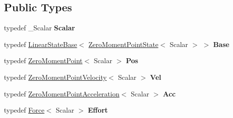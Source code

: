 \subsection*{Public Types}
\begin{DoxyCompactItemize}
\item 
typedef \+\_\+\+Scalar {\bfseries Scalar}\hypertarget{classow__core_1_1ZeroMomentPointState_ac55c44c9f7bf01c0d27d3e35f498a9af}{}\label{classow__core_1_1ZeroMomentPointState_ac55c44c9f7bf01c0d27d3e35f498a9af}

\item 
typedef \hyperlink{classow__core_1_1LinearStateBase}{Linear\+State\+Base}$<$ \hyperlink{classow__core_1_1ZeroMomentPointState}{Zero\+Moment\+Point\+State}$<$ Scalar $>$ $>$ {\bfseries Base}\hypertarget{classow__core_1_1ZeroMomentPointState_a3c319b5b41e564eec43dfaa84d9db30e}{}\label{classow__core_1_1ZeroMomentPointState_a3c319b5b41e564eec43dfaa84d9db30e}

\item 
typedef \hyperlink{classow__core_1_1ZeroMomentPoint}{Zero\+Moment\+Point}$<$ Scalar $>$ {\bfseries Pos}\hypertarget{classow__core_1_1ZeroMomentPointState_ae33e9d95811077b1879d9594f6e713d3}{}\label{classow__core_1_1ZeroMomentPointState_ae33e9d95811077b1879d9594f6e713d3}

\item 
typedef \hyperlink{classow__core_1_1ZeroMomentPointVelocity}{Zero\+Moment\+Point\+Velocity}$<$ Scalar $>$ {\bfseries Vel}\hypertarget{classow__core_1_1ZeroMomentPointState_ae0f75f285f9790374576dba825f7a874}{}\label{classow__core_1_1ZeroMomentPointState_ae0f75f285f9790374576dba825f7a874}

\item 
typedef \hyperlink{classow__core_1_1ZeroMomentPointAcceleration}{Zero\+Moment\+Point\+Acceleration}$<$ Scalar $>$ {\bfseries Acc}\hypertarget{classow__core_1_1ZeroMomentPointState_a2b61bee80d27781bce3916297fe91efb}{}\label{classow__core_1_1ZeroMomentPointState_a2b61bee80d27781bce3916297fe91efb}

\item 
typedef \hyperlink{classow__core_1_1Force}{Force}$<$ Scalar $>$ {\bfseries Effort}\hypertarget{classow__core_1_1ZeroMomentPointState_a4a63579bda54a226285b0dfda45f8fd6}{}\label{classow__core_1_1ZeroMomentPointState_a4a63579bda54a226285b0dfda45f8fd6}

\end{DoxyCompactItemize}
